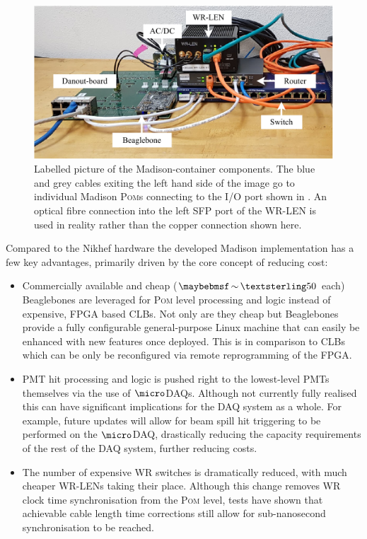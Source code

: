 \begin{figure} %
    \includegraphics[width=\textwidth]{diagrams/5-daq/madison_box.pdf}
    \caption[Labelled picture of the Madison-container components]
    {Labelled picture of the Madison-container components. The blue and grey cables exiting the
        left hand side of the image go to individual Madison \textsc{Pom}s connecting to the I/O
        port shown in . An optical fibre connection into the left SFP
        port of the WR-LEN is used in reality rather than the copper connection shown here.}
    \label{fig:madison_box}
\end{figure}

Compared to the Nikhef hardware the \chips developed Madison implementation has a few key
advantages, primarily driven by the core \chips concept of reducing cost:
\begin{itemize}
    \item Commercially available and cheap ($\sim\textsterling50$ each) Beaglebones are leveraged
    for \textsc{Pom} level processing and logic instead of expensive, FPGA based CLBs. Not only
    are they cheap but Beaglebones provide a fully configurable general-purpose Linux machine that
    can easily be enhanced with new features once deployed. This is in comparison to CLBs which
    can be only be reconfigured via remote reprogramming of the FPGA.

    \item PMT hit processing and logic is pushed right to the lowest-level PMTs themselves via the
    use of $\micro$DAQs. Although not currently fully realised this can have significant
    implications for the DAQ system as a whole. For example, future updates will allow for beam
    spill hit triggering to be performed on the $\micro$DAQ, drastically reducing the capacity
    requirements of the rest of the DAQ system, further reducing costs.

    \item The number of expensive WR switches is dramatically reduced, with much cheaper WR-LENs
    taking their place. Although this change removes WR clock time synchronisation from the
    \textsc{Pom} level, tests have shown that achievable cable length time corrections still allow
    for sub-nanosecond synchronisation to be reached.
\end{itemize}

